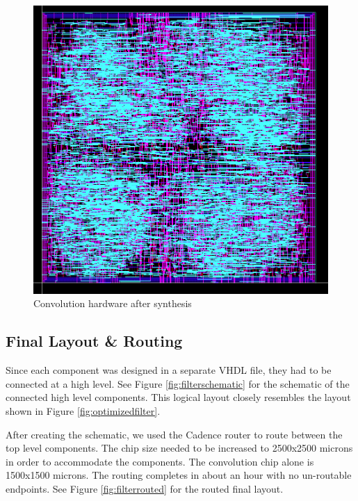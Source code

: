 \begin{figure}[htbp]
\centering
\includegraphics[width=6.5in]{images/CONV_MULT}
\caption{Convolution hardware after synthesis}
\label{fig:convmult}
\end{figure}


\subsection{Final Layout \& Routing}
Since each component was designed in a separate VHDL file, they had to be connected at a high level.  See Figure \ref{fig:filterschematic} for the schematic of the connected high level components.  This logical layout closely resembles the layout shown in Figure \ref{fig:optimizedfilter}.

After creating the schematic, we used the Cadence router to route between the top level components.  The chip size needed to be increased to 2500x2500 microns in order to accommodate the components.  The convolution chip alone is 1500x1500 microns.  The routing completes in about an hour with no un-routable endpoints.  See Figure \ref{fig:filterrouted} for the routed final layout.


